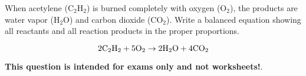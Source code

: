 

When acetylene (C$_{2}$H$_{2}$) is burned completely with oxygen (O$_{2}$), the products are water vapor (H$_{2}$O) and carbon dioxide (CO$_{2}$).  Write a balanced equation showing all reactants and all reaction products in the proper proportions.







$$\hbox{2C}_2\hbox{H}_{2} + \hbox{5O}_2 \to \hbox{2H}_2\hbox{O} + \hbox{4CO}_2$$







{\bf This question is intended for exams only and not worksheets!}.



